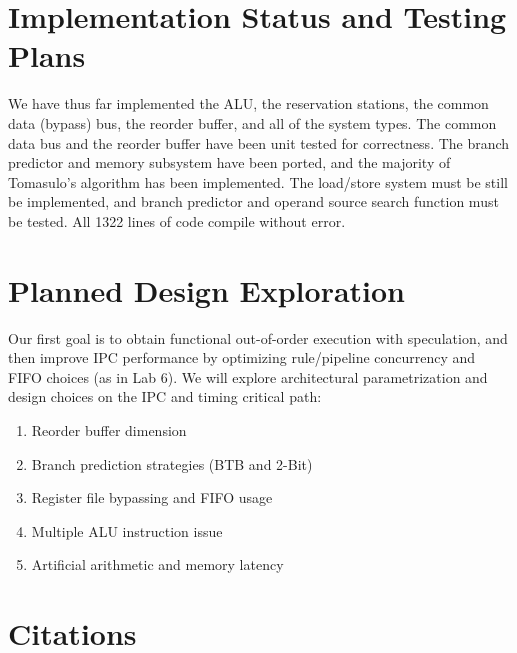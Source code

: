 \documentclass[12pt]{article}
\begin{document}
    \section{Implementation Status and Testing Plans}

      We have thus far implemented the ALU, the reservation stations, the common data (bypass) bus,
      the reorder buffer, and all of the system types. The common data bus and the reorder buffer have
      been unit tested for correctness. The branch predictor and memory subsystem have been ported,
      and the majority of Tomasulo's algorithm has been implemented. The load/store system must be
      still be implemented, and branch predictor and operand source search function must be tested.
      All 1322 lines of code compile without error.

    \section{Planned Design Exploration}
    
    Our first goal is to obtain functional out-of-order execution with speculation, and then improve IPC performance by optimizing rule/pipeline concurrency and FIFO choices (as in Lab 6). We will explore architectural parametrization and design choices on the IPC and timing critical path:    
    \begin{enumerate}
        \item Reorder buffer dimension
        \item Branch prediction strategies (BTB and 2-Bit)
        \item Register file bypassing and FIFO usage
        \item Multiple ALU instruction issue
        \item Artificial arithmetic and memory latency
    \end{enumerate}
    
    \section{Citations}
    

 
\end{document}
